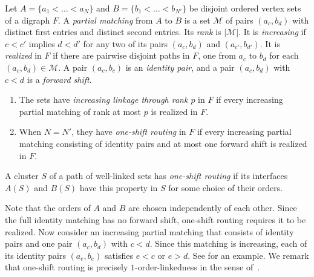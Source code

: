 \documentclass[fontsize=12pt,leading=14pt]{fullpaper}
\newcommand{\Mcal}{\mathcal{M}}
\begin{document}
\begin{definition}\label{def:s3-ordered}
  Let $A=\{a_1<\dots<a_N\}$ and $B=\{b_1<\dots<b_{N'}\}$ be disjoint ordered vertex sets of a digraph $F$.
  A \emph{partial matching} from $A$ to $B$ is a set $\Mcal$ of pairs $(a_c,b_d)$ with distinct first entries and distinct second entries.
  Its \emph{rank} is $|\Mcal|$.
  It is \emph{increasing} if $c<c'$ implies $d<d'$ for any two of its pairs $(a_c,b_d)$ and $(a_{c'},b_{d'})$.
  It is \emph{realized} in $F$ if there are pairwise disjoint paths in $F$, one from $a_c$ to $b_d$ for each $(a_c,b_d)\in\Mcal$.
  A pair $(a_c,b_c)$ is an \emph{identity pair}, and a pair $(a_c,b_d)$ with $c<d$ is a \emph{forward shift}.
  \begin{enumerate}[label=\textnormal{(\roman*)}]
    \item\label{item:s3-incr} The sets have \emph{increasing linkage through rank $p$} in $F$ if every increasing partial matching of rank at most $p$ is realized in $F$.
    \item\label{item:s3-oneshift} When $N=N'$, they have \emph{one-shift routing} in $F$ if every increasing partial matching consisting of identity pairs and at most one forward shift is realized in $F$.
  \end{enumerate}
  A cluster $S$ of a path of well-linked sets has \emph{one-shift routing} if its interfaces $A(S)$ and $B(S)$ have this property in $S$ for some choice of their orders.
\end{definition}

Note that the orders of $A$ and $B$ are chosen independently of each other.
Since the full identity matching has no forward shift, one-shift routing requires it to be realized.
Now consider an increasing partial matching that consists of identity pairs and one pair $(a_c,b_d)$ with $c<d$.
Since this matching is increasing, each of its identity pairs $(a_e,b_e)$ satisfies $e<c$ or $e>d$.
See  for an example.
We remark that one-shift routing is precisely $1$-order-linkedness in the sense of~\cite[definitions~7.1--7.2]{HKMM26a}.
\end{document}
